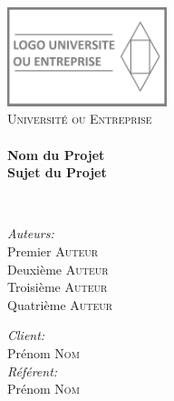 \begin{titlepage}
\begin{center}

~\bigskip

\includegraphics[width=0.35\textwidth]{./logo}\\[1cm]

\textsc{\LARGE Université ou Entreprise}\\[1.5cm]

\HRule \\[0.4cm]

{\huge \bfseries Nom du Projet\\
Sujet du Projet \\[0.4cm] }

\HRule \\[1.5cm]

\begin{minipage}{0.4\textwidth}
\begin{flushleft} \large
\emph{Auteurs:}\\
Premier \textsc{Auteur}\\
Deuxième \textsc{Auteur}\\
Troisième \textsc{Auteur}\\
Quatrième \textsc{Auteur}
\end{flushleft}
\end{minipage}
\begin{minipage}{0.4\textwidth}
\begin{flushright} \large
\emph{Client:} \\
Prénom \textsc{Nom}\\
\emph{Référent:} \\
Prénom \textsc{Nom}
\end{flushright}
\end{minipage}

~\bigskip
\bigskip
\bigskip
\bigskip

\begin{abstract}


\end{abstract}
\end{center}
\end{titlepage}
